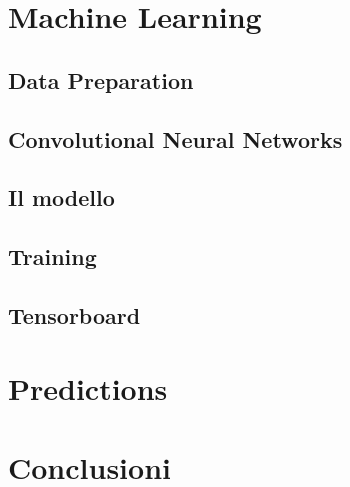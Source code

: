 \documentclass[12pt,twoside,openright]{report}
\begin{document}
  \chapter{Machine Learning}
  \section{Data Preparation}
  
  \section{Convolutional Neural Networks}
  
  \section{Il modello}
  
  \section{Training}
  
  \section{Tensorboard}
  
  
  \chapter{Predictions}
  
  
  \setcounter{secnumdepth}{-1}
  \chapter{Conclusioni}
  
  
\end{document}
